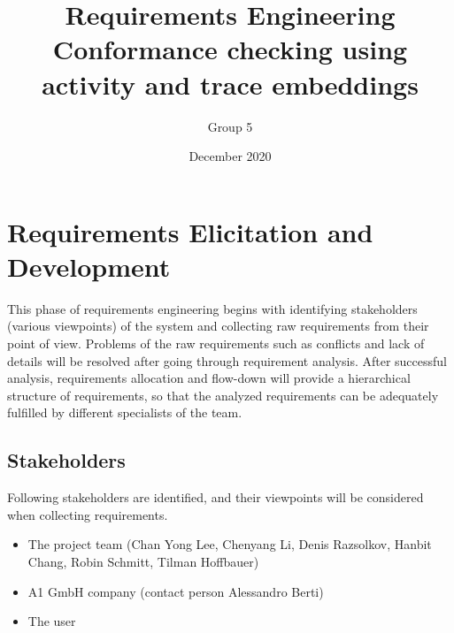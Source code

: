 \documentclass{article}
\title{Requirements Engineering\\ Conformance checking using activity and trace embeddings}
\author{Group 5 }
\date{December 2020}
\begin{document}
\maketitle

\newpage
\tableofcontents
\newpage


\section{Requirements Elicitation and Development}
This phase of requirements engineering begins with identifying stakeholders (various viewpoints) of the system and collecting raw requirements from their point of view. Problems of the raw requirements such as conflicts and lack of details will be resolved after going through requirement analysis. After successful analysis, requirements allocation and flow-down will provide a hierarchical structure of requirements, so that the analyzed requirements can be adequately fulfilled by different specialists of the team.

\subsection{Stakeholders}
Following stakeholders are identified, and their viewpoints will be considered when collecting requirements.
\begin{itemize}
  \item The project team (Chan Yong Lee, Chenyang Li, Denis Razsolkov, Hanbit Chang, Robin Schmitt, Tilman Hoffbauer)
  \item A1 GmbH company (contact person Alessandro Berti)
  \item The user
\end{itemize}
\end{document}
